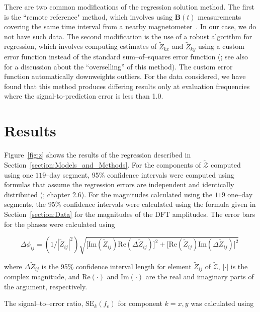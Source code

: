 \documentclass[draft,linenumbers]{agujournal2018}
\begin{document}
There are two common modifications of the regression solution method. The first is the ``remote reference"  method, which involves using $\mathbf{B}(t)$ measurements covering the same time interval from a nearby magnetometer~\citep{Simpson2005}. In our case, we do not have such data. The second modification is the use of a robust algorithm for regression, which involves computing estimates of $\widetilde{Z}_{kx}$ and $\widetilde{Z}_{ky}$ using a custom error function instead of the standard sum--of--squares error function (\cite{Simpson2005}; see also~\cite{Thomson2016} for a discussion about the ``overselling'' of this method). The custom error function automatically downweights outliers. For the data considered, we have found that this method produces differing results only at evaluation frequencies where the signal-to-prediction error is less than 1.0.

\section{Results}
\label{section:Results}

Figure~\ref{fig:z} shows the results of the regression described in Section~\ref{section:Models_and_Methods}. For the components of $\boldsymbol{\mathcal{\widetilde{Z}}}$ computed using one $119$--day segment, 95\% confidence intervals were computed using formulas that assume the regression errors are independent and identically distributed (\cite{Draper1981}; chapter 2.6). For the magnitudes calculated using the $119$ one--day segments, the 95\% confidence intervals were calculated using the formula given in Section~\ref{section:Data} for the magnitudes of the DFT amplitudes. The error bars for the phases were calculated using

$$\Delta\phi_{ij} = (1/|\widetilde{Z}_{ij}|^2) \sqrt{ \big[\text{Im}(\widetilde{Z}_{ij})\text{Re}(\Delta \widetilde{Z}_{ij})\big]^2 + \big[\text{Re}(\widetilde{Z}_{ij})\text{Im}(\Delta \widetilde{Z}_{ij}) \big]^2}\;$$

\noindent where $\Delta \widetilde{Z}_{ij}$ is the 95\% confidence interval length for element $\widetilde{Z}_{ij}$ of $\boldsymbol{\mathcal{\widetilde{Z}}}$, $|\boldsymbol{\cdotp}|$ is the complex magnitude, and $\text{Re}(\boldsymbol{\cdotp})$ and $\text{Im}(\boldsymbol{\cdotp})$ are the real and imaginary parts of the argument, respectively.

The signal--to--error ratio, $\text{SE}_k(f_e)$ for component $k=x,y$ was calculated using 
\end{document}

